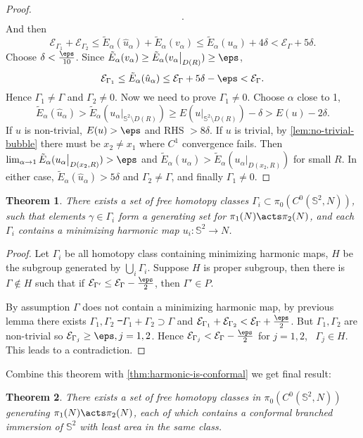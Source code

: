 \documentclass[UTF8,12pt]{article}
\theoremstyle{plain}\newtheorem{theorem}{Theorem}
\theoremstyle{definition}\newtheorem{definition}[theorem]{Definition}
\theoremstyle{definition}\newtheorem{example}[theorem]{Example}
\theoremstyle{plain}\newtheorem{axiom}[theorem]{Axiom}
\theoremstyle{plain}\newtheorem{assertion}[theorem]{Assertion}
\theoremstyle{plain}\newtheorem{corollary}[theorem]{Corollary}
\theoremstyle{plain}\newtheorem{lemma}[theorem]{Lemma}
\theoremstyle{plain}\newtheorem{proposition}[theorem]{Proposition}
\theoremstyle{plain}\newtheorem{prop}[theorem]{Proposition}
\theoremstyle{plain}\newtheorem{conjecture}[theorem]{Conjecture}
\theoremstyle{plain}\newtheorem{conj}[theorem]{Conjecture}
\theoremstyle{plain}\newtheorem{problem}[theorem]{Problem}
\theoremstyle{remark}\newtheorem{notation}[theorem]{Notation}
\theoremstyle{definition}\newtheorem*{question}{Question}
\theoremstyle{definition}\newtheorem*{answer}{Answer}
\theoremstyle{definition}\newtheorem*{goal}{Goal}
\theoremstyle{plain}\newtheorem*{application}{Application}
\theoremstyle{plain}\newtheorem*{exercise}{Exercise}
\theoremstyle{remark}\newtheorem*{remark}{Remark}
\theoremstyle{remark}\newtheorem*{note}{\small{Note}}
\numberwithin{equation}{section}
\numberwithin{theorem}{section}
\numberwithin{figure}{section}
\newcommand{\Eps}{\mathcal{E}}
\begin{document}
\begin{proof}
\begin{align*}
    .\end{align*}
    And then \[
        \Eps_{\Gamma_1}+\Eps_{\Gamma_2}\le \tilde{E}_\alpha(\hat{u}_\alpha)
        +\tilde{E}_\alpha(v_\alpha)\le \tilde{E}_\alpha(u_\alpha)+4\delta
        <\Eps_\Gamma+5\delta
    .\] Choose \(\delta<\frac{\eps}{10}\). Since \(\tilde{E}_\alpha(v_\alpha)\ge
    \tilde{E}_\alpha(v_\alpha\big|_{D(R)})\ge\eps\), \[
        \Eps_{\Gamma_1}\le \tilde{E}_\alpha(\hat{u}_\alpha)
        \le \Eps_{\Gamma}+5\delta-\eps<\Eps_\Gamma
    .\] Hence \(\Gamma_1\neq \Gamma\) and \(\Gamma_2\neq 0\). Now we need to prove
    \(\Gamma_1\neq 0\). Choose \(\alpha\) close to 1, \[
        \tilde{E}_\alpha(\hat{u}_\alpha)>\tilde{E}_\alpha(u_\alpha\big|_{\mathbb{S}^2
        \setminus D(R)})\ge E(u\big|_{\mathbb{S}^2\setminus D(R)})-\delta
        >E(u)-2\delta
    .\] If \(u\) is non-trivial, \(E(u)>\eps\) and RHS \(>8\delta\). If \(u\) is
    trivial, by \cref{lem:no-trivial-bubble} there must be \(x_2\neq x_1\) where
    \(C^1\) convergence fails. Then \(\lim_{\alpha\to 1}\tilde{E}_\alpha(u_\alpha
    \big|_{D(x_2,R)})>\eps\) and \(\tilde{E}_\alpha(\hat{u}_\alpha)>
    \tilde{E}_\alpha(u_\alpha\big|_{D(x_2,R)})\) for small \(R\). In either case,
    \(\tilde{E}_\alpha(\hat{u}_\alpha)>5\delta\) and \(\Gamma_2\neq \Gamma\), and
    finally \(\Gamma_1\neq 0\).
\end{proof}

\begin{theorem}
    There exists a set of free homotopy classes \(\Gamma_i\subset\pi_0(C^0(
    \mathbb{S}^2,N))\), such that elements \(\gamma\in \Gamma_i\) form a generating 
    set for \(\pi_1(N)\acts \pi_2(N)\), and each \(\Gamma_i\) contains a minimizing
    harmonic map \(u_i\colon \mathbb{S}^2\to N\).
\end{theorem}
\begin{proof}
    Let \(\Gamma_i\) be all homotopy class containing minimizing harmonic maps,
    \(H\) be the subgroup generated by \(\bigcup_{i}\Gamma_i\). Suppose \(H\) is
    proper subgroup, then there is \(\Gamma\notin H\) such that if \(\Eps_{\Gamma'}
    \le \Eps_{\Gamma}-\frac{\eps}{2}\), then \(\Gamma'\in P\).

    By assumption \(\Gamma\) does not contain a minimizing harmonic map, by previous
    lemma there exists \(\Gamma_1,\Gamma_2\) \st\ \(\Gamma_1+\Gamma_2\supset \Gamma\)
    and \(\Eps_{\Gamma_1}+\Eps_{\Gamma_2}<\Eps_\Gamma+\frac{\eps}{2}\).
    But \(\Gamma_1,\Gamma_2\) are non-trivial so \(\Eps_{\Gamma_j}\ge \eps,j=1,2\).
    Hence \(\Eps_{\Gamma_j}<\Eps_\Gamma-\frac{\eps}{2}\) for \(j=1,2\), \ie\ 
    \(\Gamma_j\in H\). This leads to a contradiction.
\end{proof}

Combine this theorem with \cref{thm:harmonic-is-conformal} we get final result:
\begin{theorem}
    There exists a set of free homotopy classes in \(\pi_0(C^0(\mathbb{S}^2,N))\)
    generating \(\pi_1(N)\acts \pi_2(N)\), each of which contains a conformal
    branched immersion of \(\mathbb{S}^2\) with least area in the same class.
\end{theorem}

\end{document}
